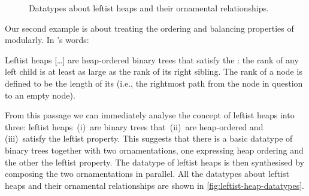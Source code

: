 \begin{figure}
\begin{center}
\end{center}
\caption{Datatypes about leftist heaps and their ornamental relationships.}
\label{fig:leftist-heap-datatypes}
\end{figure}

Our second example is about treating the ordering and balancing properties of  modularly.
In \citeauthor{Okasaki-data-structures}'s words:
\begin{quoting}\relax
Leftist heaps [\ldots$\!$] are heap-ordered binary trees that satisfy the : the rank of any left child is at least as large as the rank of its right sibling. The rank of a node is defined to be the length of its  (i.e., the rightmost path from the node in question to an empty node).
\end{quoting}
From this passage we can immediately analyse the concept of leftist heaps into three: leftist heaps \,(i)~are binary trees that \,(ii)~are heap-ordered and \,(iii)~satisfy the leftist property.
This suggests that there is a basic datatype of binary trees together with two ornamentations, one expressing heap ordering and the other the leftist property.
The datatype of leftist heaps is then synthesised by composing the two ornamentations in parallel.
All the datatypes about leftist heaps and their ornamental relationships are shown in \autoref{fig:leftist-heap-datatypes}.

